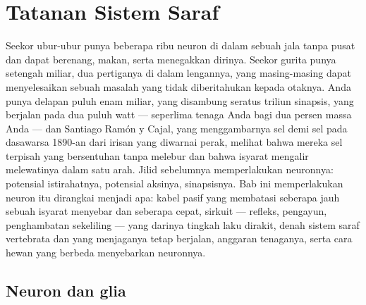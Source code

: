 \chapter{Tatanan Sistem Saraf}\label{ch:b3:nervous-systems}

Seekor ubur-ubur punya beberapa ribu neuron di dalam sebuah jala tanpa pusat
dan dapat berenang, makan, serta menegakkan dirinya. Seekor gurita punya
setengah miliar, dua pertiganya di dalam lengannya, yang masing-masing dapat
menyelesaikan sebuah masalah yang tidak diberitahukan kepada otaknya. Anda punya
delapan puluh enam miliar, yang disambung seratus triliun sinapsis, yang
berjalan pada dua puluh watt --- seperlima tenaga Anda bagi dua persen massa
Anda --- dan Santiago Ramón y Cajal, yang menggambarnya sel demi sel pada
dasawarsa 1890-an dari irisan yang diwarnai perak, melihat bahwa mereka sel
terpisah yang bersentuhan tanpa melebur dan bahwa isyarat mengalir melewatinya
dalam satu arah. Jilid sebelumnya memperlakukan neuronnya: potensial istirahatnya,
potensial aksinya, sinapsisnya. Bab ini memperlakukan neuron itu dirangkai
menjadi apa: kabel pasif yang membatasi seberapa jauh sebuah isyarat menyebar dan
seberapa cepat, sirkuit --- refleks, pengayun, penghambatan sekeliling ---
yang darinya tingkah laku dirakit, denah sistem saraf vertebrata dan  yang
menjaganya tetap berjalan, anggaran tenaganya, serta cara hewan yang berbeda
menyebarkan neuronnya.

\section{Neuron dan glia}


